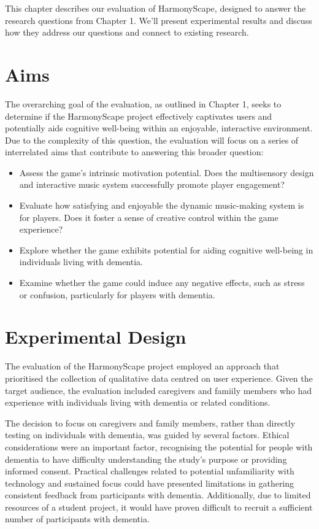 \documentclass{l4proj}
\begin{document}
This chapter describes our evaluation of HarmonyScape, designed to answer the research questions from Chapter 1. We'll present experimental results and discuss how they address our questions and connect to existing research.

\section{Aims}
The overarching goal of the evaluation, as outlined in Chapter 1, seeks to determine if the HarmonyScape project effectively captivates users and potentially aids cognitive well-being within an enjoyable, interactive environment. Due to the complexity of this question, the evaluation will focus on a series of interrelated aims that contribute to answering this broader question:

\begin{itemize}
    \item Assess the game's intrinsic motivation potential. Does the multisensory design and interactive music system successfully promote player engagement?
    \item Evaluate how satisfying and enjoyable the dynamic music-making system is for players. Does it foster a sense of creative control within the game experience?
    \item Explore whether the game exhibits potential for aiding cognitive well-being in individuals living with dementia.
    \item Examine whether the game could induce any negative effects, such as stress or confusion, particularly for players with dementia.
\end{itemize}

\section{Experimental Design}
The evaluation of the HarmonyScape project employed an approach that prioritised the collection of qualitative data centred on user experience. Given the target audience, the evaluation included caregivers and famiily members who had experience with individuals living with dementia or related conditions.

The decision to focus on caregivers and family members, rather than directly testing on individuals with dementia, was guided by several factors. Ethical considerations were an important factor, recognising the potential for people with dementia to have difficulty understanding the study's purpose or providing informed consent. Practical challenges related to potential unfamiliarity with technology and sustained focus could have presented limitations in gathering consistent feedback from participants with dementia. Additionally, due to limited resources of a student project, it would have proven difficult to recruit a sufficient number of participants with dementia.
\end{document}
